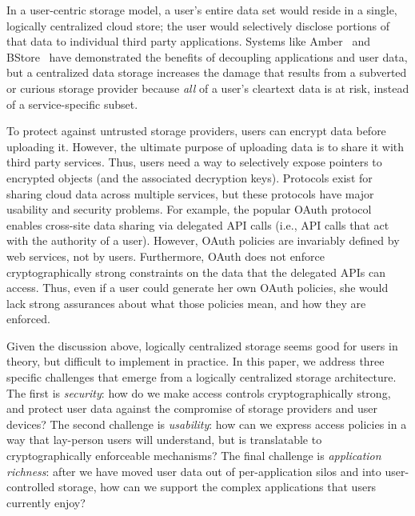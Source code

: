In a user-centric storage model, a user's
entire data set would reside in a single,
logically centralized cloud store; the user
would selectively disclose portions of that
data to individual third party applications.
Systems like Amber~\cite{amber} and BStore~\cite{bstore}
have demonstrated the benefits of 
decoupling applications and user
data, but a centralized data storage
increases the damage that results from a
subverted or curious storage provider because
\emph{all} of a user's cleartext data is at
risk, instead of a service-specific subset.

To protect against untrusted storage providers,
users can encrypt data before uploading it.
However, the ultimate purpose of uploading
data is to share it with third party services.
Thus, users need a way to selectively expose
pointers to encrypted objects (and the associated
decryption keys). Protocols exist for sharing
cloud data across multiple services, but these
protocols have major usability and security
problems. For example, the popular OAuth
protocol~\cite{oauth} enables cross-site data
sharing via delegated API calls (i.e., API
calls that act with the authority of a user).
However, OAuth policies are invariably defined
by web services, not by users. Furthermore,
OAuth does not enforce cryptographically strong
constraints on the data that the delegated
APIs can access. Thus, even if a user could
generate her own OAuth policies, she would
lack strong assurances about what those policies
mean, and how they are enforced.

Given the discussion above, logically centralized
storage seems good for users in theory, but
difficult to implement in practice. In this
paper, we address three specific challenges
that emerge from a logically centralized storage
architecture. The first is \emph{security}: how
do we make access controls cryptographically
strong, and protect user data against the
compromise of storage providers and user devices?
The second challenge is \emph{usability}: how
can we express access policies in a way that
lay-person users will understand, but is
translatable to cryptographically enforceable
mechanisms? The final challenge is \emph{application
richness}: after we have moved user data out
of per-application silos and into user-controlled
storage, how can we support the complex 
applications that users currently enjoy?

